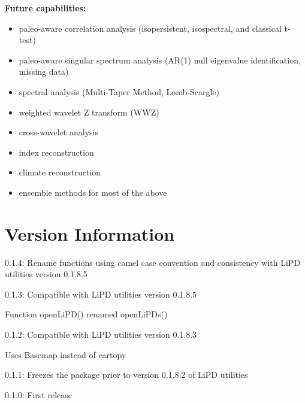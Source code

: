 \documentclass[letterpaper,10pt,english]{sphinxmanual}
\begin{document}
\textbf{Future capabilities:}
\begin{itemize}
\item {} 
paleo-aware correlation analysis (isopersistent, isospectral, and classical t-test)

\item {} 
paleo-aware singular spectrum analysis (AR(1) null eigenvalue identification, missing data)

\item {} 
spectral analysis (Multi-Taper Method, Lomb-Scargle)

\item {} 
weighted wavelet Z transform (WWZ)

\item {} 
cross-wavelet analysis

\item {} 
index reconstruction

\item {} 
climate reconstruction

\item {} 
ensemble methods for most of the above

\end{itemize}


\section{Version Information}
\label{Introduction:version-information}
\begin{DUlineblock}{0em}
\item[] 0.1.4: Rename functions using camel case convention and consistency with LiPD utilities version 0.1.8.5
\item[] 0.1.3: Compatible with LiPD utilities version 0.1.8.5
\item[]
\begin{DUlineblock}{\DUlineblockindent}
\item[] Function openLiPD() renamed openLiPDs()
\end{DUlineblock}
\item[] 0.1.2: Compatible with LiPD utilities version 0.1.8.3
\item[]
\begin{DUlineblock}{\DUlineblockindent}
\item[] Uses Basemap instead of cartopy
\end{DUlineblock}
\item[] 0.1.1: Freezes the package prior to version 0.1.8.2 of LiPD utilities
\item[] 0.1.0: First release
\end{DUlineblock}
\end{document}
